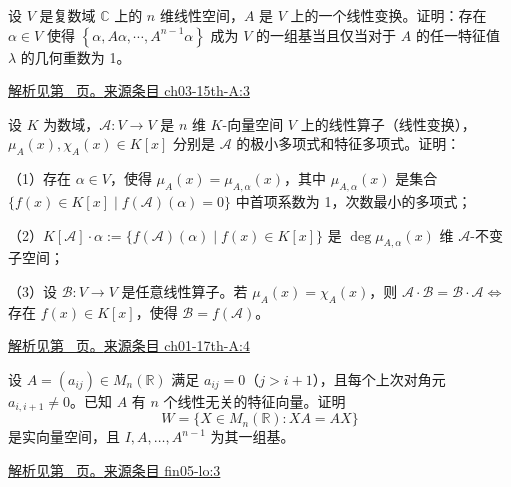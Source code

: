 \documentclass[UTF8,12pt,a4paper,fontset=fandol]{ctexart}
\begin{document}
\begin{example}\label{ex:ch03-15th-A:3}

设 $V$ 是复数域 $\mathbb{C}$ 上的 $n$ 维线性空间，$A$ 是 $V$ 上的一个线性变换。证明：存在 $\alpha \in V$ 使得 $\left\{\alpha, A\alpha, \cdots, A^{n-1}\alpha\right\}$ 成为 $V$ 的一组基当且仅当对于 $A$ 的任一特征值 $\lambda$ 的几何重数为 1。

\par\hyperref[ans:ch03-15th-A:3]{解析见第~\pageref{ans:ch03-15th-A:3} 页。}\quad\href{https://github.com/lzxcr/cmc-mathematics/blob/64916fa1fdbc3e444a652eca204d5669058ee321/src/problems/preliminary/15/03.md}{来源条目 ch03-15th-A:3}

\end{example}

\begin{example}\label{ex:ch01-17th-A:4}

设 $K$ 为数域，$\mathcal{A}: V \rightarrow V$ 是 $n$ 维 $K$-向量空间 $V$ 上的线性算子（线性变换），$\mu_A(x), \chi_A(x) \in K[x]$ 分别是 $\mathcal{A}$ 的极小多项式和特征多项式。证明：

（1）存在 $\alpha \in V$，使得 $\mu_A(x) = \mu_{A,\alpha}(x)$，其中 $\mu_{A,\alpha}(x)$ 是集合 $\{f(x) \in K[x] \mid f(\mathcal{A})(\alpha) = 0\}$ 中首项系数为 1，次数最小的多项式；

（2）$K[\mathcal{A}] \cdot \alpha := \{f(\mathcal{A})(\alpha) \mid f(x) \in K[x]\}$ 是 $\deg \mu_{A,\alpha}(x)$ 维 $\mathcal{A}$-不变子空间；

（3）设 $\mathcal{B}: V \rightarrow V$ 是任意线性算子。若 $\mu_A(x) = \chi_A(x)$，则 $\mathcal{A} \cdot \mathcal{B} = \mathcal{B} \cdot \mathcal{A} \Leftrightarrow$ 存在 $f(x) \in K[x]$，使得 $\mathcal{B} = f(\mathcal{A})$。

\par\hyperref[ans:ch01-17th-A:4]{解析见第~\pageref{ans:ch01-17th-A:4} 页。}\quad\href{https://github.com/lzxcr/cmc-mathematics/blob/64916fa1fdbc3e444a652eca204d5669058ee321/src/problems/preliminary/17/04.md}{来源条目 ch01-17th-A:4}

\end{example}

\begin{example}\label{ex:fin05-lo:3}

设 $A=(a_{ij})\in M_n(\mathbb R)$ 满足 $a_{ij}=0$（$j>i+1$），且每个上次对角元 $a_{i,i+1}\ne0$。已知 $A$ 有 $n$ 个线性无关的特征向量。证明
\[
W=\{X\in M_n(\mathbb R):XA=AX\}
\]
是实向量空间，且 $I,A,\ldots,A^{n-1}$ 为其一组基。

\par\hyperref[ans:fin05-lo:3]{解析见第~\pageref{ans:fin05-lo:3} 页。}\quad\href{https://github.com/lzxcr/cmc-mathematics/blob/64916fa1fdbc3e444a652eca204d5669058ee321/src/problems/finals/05/06.md}{来源条目 fin05-lo:3}

\end{example}
\end{document}

